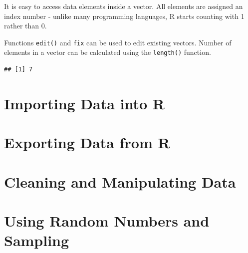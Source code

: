 \documentclass[11pt, letterpaper, twoside]{memoir}\usepackage{knitr}
\begin{document}
It is easy to access data elements inside a vector. All elements are assigned an index number - unlike many programming languages, R starts counting with 1 rather than 0. 

\begin{knitrout}
\color{fgcolor}\begin{kframe}
\begin{alltt}
 \hlkwb{<-} \hlstd{work.per.day[}\hlstd{]} 
\hlstd{work.per.day[}\hlstd{]} \hlkwb{<-}  
\end{alltt}
\end{kframe}
\end{knitrout}

Functions \texttt{edit()} and \texttt{fix} can be used to edit existing vectors. Number of elements in a vector can be calculated using the \texttt{length()} function.
\begin{knitrout}
\color{fgcolor}\begin{kframe}
\begin{alltt}
\end{alltt}
\begin{verbatim}
## [1] 7
\end{verbatim}
\end{kframe}
\end{knitrout}

\section{Importing Data into R}


\section{Exporting Data from R}

\section{Cleaning and Manipulating Data}


\section{Using Random Numbers and Sampling}
\end{document}
